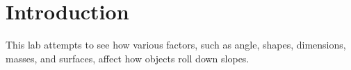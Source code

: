 \section{Introduction}

This lab attempts to see how various factors, such as angle, shapes, dimensions, masses, and surfaces, affect how objects roll down slopes.


